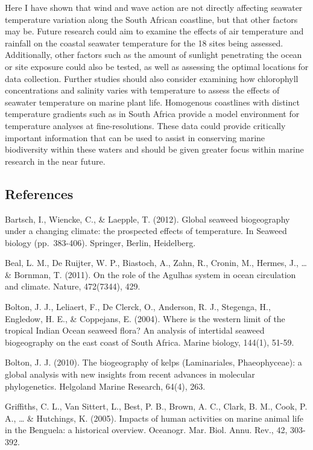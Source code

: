 \documentclass[12pt,]{article}
\begin{document}
Here I have shown that wind and wave action are not directly affecting
seawater temperature variation along the South African coastline, but
that other factors may be. Future research could aim to examine the
effects of air temperature and rainfall on the coastal seawater
temperature for the 18 sites being assessed. Additionally, other factors
such as the amount of sunlight penetrating the ocean or site exposure
could also be tested, as well as assessing the optimal locations for
data collection. Further studies should also consider examining how
chlorophyll concentrations and salinity varies with temperature to
assess the effects of seawater temperature on marine plant life.
Homogenous coastlines with distinct temperature gradients such as in
South Africa provide a model environment for temperature analyses at
fine-resolutions. These data could provide critically important
information that can be used to assist in conserving marine biodiversity
within these waters and should be given greater focus within marine
research in the near future.

\subsection{References}\label{references}

Bartsch, I., Wiencke, C., \& Laepple, T. (2012). Global seaweed
biogeography under a changing climate: the prospected effects of
temperature. In Seaweed biology (pp.~383-406). Springer, Berlin,
Heidelberg.

Beal, L. M., De Ruijter, W. P., Biastoch, A., Zahn, R., Cronin, M.,
Hermes, J., \ldots{} \& Bornman, T. (2011). On the role of the Agulhas
system in ocean circulation and climate. Nature, 472(7344), 429.

Bolton, J. J., Leliaert, F., De Clerck, O., Anderson, R. J., Stegenga,
H., Engledow, H. E., \& Coppejans, E. (2004). Where is the western limit
of the tropical Indian Ocean seaweed flora? An analysis of intertidal
seaweed biogeography on the east coast of South Africa. Marine biology,
144(1), 51-59.

Bolton, J. J. (2010). The biogeography of kelps (Laminariales,
Phaeophyceae): a global analysis with new insights from recent advances
in molecular phylogenetics. Helgoland Marine Research, 64(4), 263.

Griffiths, C. L., Van Sittert, L., Best, P. B., Brown, A. C., Clark, B.
M., Cook, P. A., \ldots{} \& Hutchings, K. (2005). Impacts of human
activities on marine animal life in the Benguela: a historical overview.
Oceanogr. Mar. Biol. Annu. Rev., 42, 303-392.
\end{document}
